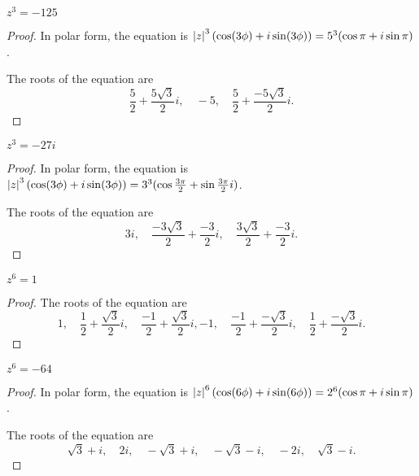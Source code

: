 \begin{exercise}
    $z^{3} = -125$
\end{exercise}

\begin{proof}
    In polar form, the equation is $\left\vert{z}\right\vert^{3}(\cos (3\phi) + i\sin (3\phi)) = 5^{3}(\cos\pi + i\sin\pi)$.

    The roots of the equation are
    \[
        \frac{5}{2} + \frac{5\sqrt{3}}{2}i,\quad -5,\quad \frac{5}{2} + \frac{-5\sqrt{3}}{2}i.
    \]
\end{proof}

\begin{exercise}
    $z^{3} = -27i$
\end{exercise}

\begin{proof}
    In polar form, the equation is $\left\vert{z}\right\vert^{3}(\cos (3\phi) + i\sin (3\phi)) = 3^{3}(\cos\frac{3\pi}{2} + \sin\frac{3\pi}{2}i)$.

    The roots of the equation are
    \[
        3i,\quad \frac{-3\sqrt{3}}{2} + \frac{-3}{2}i,\quad\frac{3\sqrt{3}}{2} + \frac{-3}{2}i.
    \]
\end{proof}

\begin{exercise}
    $z^{6} = 1$
\end{exercise}

\begin{proof}
    The roots of the equation are
    \[
        1,\quad \frac{1}{2} + \frac{\sqrt{3}}{2}i,\quad \frac{-1}{2} + \frac{\sqrt{3}}{2}i, -1,\quad \frac{-1}{2} + \frac{-\sqrt{3}}{2}i,\quad \frac{1}{2} + \frac{-\sqrt{3}}{2}i.
    \]
\end{proof}

\begin{exercise}
    $z^{6} = -64$
\end{exercise}

\begin{proof}
    In polar form, the equation is $\left\vert{z}\right\vert^{6}(\cos(6\phi) + i\sin(6\phi)) = 2^{6}(\cos\pi + i\sin\pi)$.


    The roots of the equation are
    \[
        \sqrt{3} + i,\quad 2i,\quad -\sqrt{3} + i,\quad -\sqrt{3} - i,\quad -2i,\quad \sqrt{3} - i.
    \]
\end{proof}

